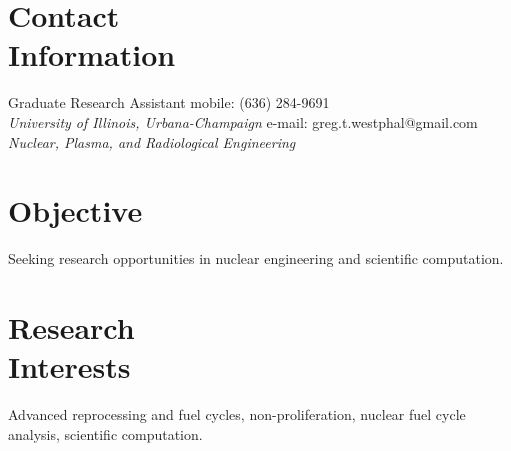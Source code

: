 \documentclass[margin,line]{resume}
\begin{document}
\begin{resume}

    \section{\mysidestyle Contact\\Information}
    Graduate Research Assistant \hfill mobile: (636) 284-9691 \vspace{0mm}\\\vspace{0mm}%
        \textsl{University of Illinois, Urbana-Champaign}
        \hfill e-mail: greg.t.westphal@gmail.com            \vspace{0mm}\\\vspace{0mm}%
    \textsl{Nuclear, Plasma, and Radiological Engineering}
        \vspace{0mm}\\\vspace{0mm}%

    \section{\mysidestyle Objective}
		Seeking research opportunities in nuclear engineering and scientific computation.%
    \section{\mysidestyle Research\\Interests}
		Advanced reprocessing and fuel cycles, non-proliferation, 
			nuclear fuel cycle analysis, scientific computation.%

\end{resume}
\end{document}
